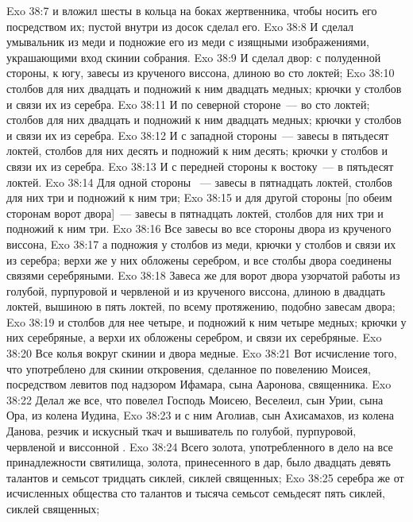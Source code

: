 \vs Exo 38:7 и вложил шесты в кольца на боках жертвенника, чтобы носить его посредством их; пустой внутри из досок сделал его.
\rsbpar\vs Exo 38:8 И сделал умывальник из меди и подножие его из меди с изящными изображениями, украшающими вход скинии собрания.
\rsbpar\vs Exo 38:9 И сделал двор: с полуденной стороны, к югу, завесы из крученого виссона, длиною во сто локтей;
\vs Exo 38:10 столбов для них двадцать и подножий к ним двадцать медных; крючки у столбов и связи их из серебра.
\vs Exo 38:11 И по северной стороне~---  во сто локтей; столбов для них двадцать и подножий к ним двадцать медных; крючки у столбов и связи их из серебра.
\vs Exo 38:12 И с западной стороны~--- завесы в пятьдесят локтей, столбов для них десять и подножий к ним десять; крючки у столбов и связи их из серебра.
\vs Exo 38:13 И с передней стороны к востоку~---  в пятьдесят локтей.
\vs Exo 38:14 Для одной стороны ~--- завесы в пятнадцать локтей, столбов для них три и подножий к ним три;
\vs Exo 38:15 и для другой стороны [по обеим сторонам ворот двора]~--- завесы в пятнадцать локтей, столбов для них три и подножий к ним три.
\vs Exo 38:16 Все завесы во все стороны двора из крученого виссона,
\vs Exo 38:17 а подножия у столбов из меди, крючки у столбов и связи их из серебра; верхи же у них обложены серебром, и все столбы двора соединены связями серебряными.
\vs Exo 38:18 Завеса же для ворот двора узорчатой работы из голубой, пурпуровой и червленой  и из крученого виссона, длиною в двадцать локтей, вышиною в пять локтей, по всему протяжению, подобно завесам двора;
\vs Exo 38:19 и столбов для нее четыре, и подножий к ним четыре медных; крючки у них серебряные, а верхи их обложены серебром, и связи их серебряные.
\vs Exo 38:20 Все колья вокруг скинии и двора медные.
\rsbpar\vs Exo 38:21 Вот исчисление того, что употреблено для скинии откровения, сделанное по повелению Моисея, посредством левитов под надзором Ифамара, сына Ааронова, священника.
\vs Exo 38:22 Делал же все, что повелел Господь Моисею, Веселеил, сын Урии, сына Ора, из колена Иудина,
\vs Exo 38:23 и с ним Аголиав, сын Ахисамахов, из колена Данова, резчик и искусный ткач и вышиватель по голубой, пурпуровой, червленой и виссонной .
\vs Exo 38:24 Всего золота, употребленного в дело на все принадлежности святилища, золота, принесенного в дар, было двадцать девять талантов и семьсот тридцать сиклей, сиклей священных;
\vs Exo 38:25 серебра же от исчисленных  общества сто талантов и тысяча семьсот семьдесят пять сиклей, сиклей священных;
